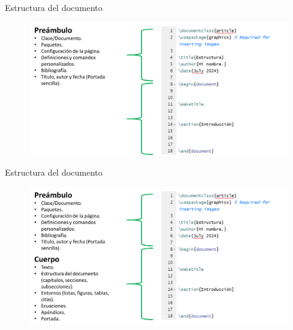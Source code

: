 \documentclass[aspectratio=169, 10pt]{beamer}
\begin{document}
\begin{frame}[fragile]{Estructura del documento}

\begin{figure}
    \centering
    \includegraphics[scale=0.32]{Estructura4.png} 
    \label{fig:enter-label}
\end{figure}
\end{frame}

\begin{frame}[fragile]{Estructura del documento}

\begin{figure}
    \centering
    \includegraphics[scale=0.32]{Estructura5.png} 
    \label{fig:enter-label}
\end{figure}
\end{frame}
\end{document}
